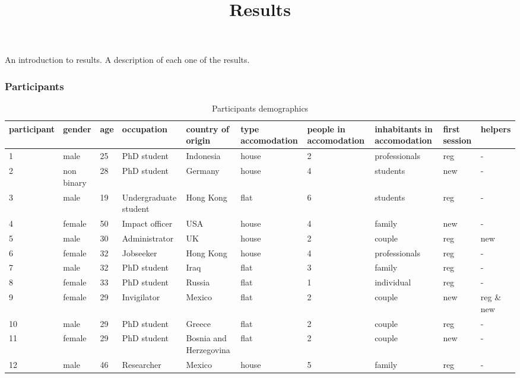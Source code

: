 \documentclass[]{article}
\title{Results}
\author{}
\date{\vspace{-2.5em}}
\begin{document}
\maketitle

An introduction to results. A description of each one of the results.

\subsubsection{Participants}\label{participants}

\begin{table}

\caption{\label{tab:unnamed-chunk-1}Participants demographics}
\centering
\begin{tabular}[t]{l|l|l|l|l|l|l|l|l|l}
\hline
participant & gender & age & occupation & country of origin & type accomodation & people in accomodation & inhabitants in accomodation & first session & helpers\\
\hline
\rowcolor{gray!6}  1 & male & 25 & PhD student & Indonesia & house & 2 & professionals & reg & -\\
\hline
2 & non binary & 28 & PhD student & Germany & house & 4 & students & new & -\\
\hline
\rowcolor{gray!6}  3 & male & 19 & Undergraduate student & Hong Kong & flat & 6 & students & reg & -\\
\hline
4 & female & 50 & Impact officer & USA & house & 4 & family & new & -\\
\hline
\rowcolor{gray!6}  5 & male & 30 & Administrator & UK & house & 2 & couple & reg & new\\
\hline
6 & female & 32 & Jobseeker & Hong Kong & house & 4 & professionals & reg & -\\
\hline
\rowcolor{gray!6}  7 & male & 32 & PhD student & Iraq & flat & 3 & family & reg & -\\
\hline
8 & female & 33 & PhD student & Russia & flat & 1 & individual & reg & -\\
\hline
\rowcolor{gray!6}  9 & female & 29 & Invigilator & Mexico & flat & 2 & couple & new & reg \& new\\
\hline
10 & male & 29 & PhD student & Greece & flat & 2 & couple & reg & -\\
\hline
\rowcolor{gray!6}  11 & female & 29 & PhD student & Bosnia and Herzegovina & flat & 2 & couple & new & -\\
\hline
12 & male & 46 & Researcher & Mexico & house & 5 & family & reg & -\\

\end{tabular}
\end{table}
\end{document}
